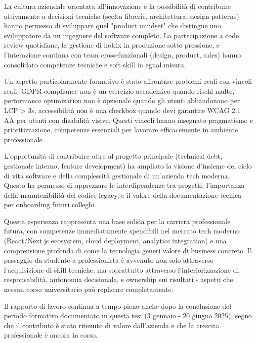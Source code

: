 La cultura aziendale orientata all'innovazione e la possibilità di 
contribuire attivamente a decisioni tecniche (scelta librerie, 
architettura, design patterns) hanno permesso di sviluppare quel 
"product mindset" che distingue uno sviluppatore da un ingegnere del 
software completo. La partecipazione a code review quotidiane, la 
gestione di hotfix in produzione sotto pressione, e l'interazione 
continua con team cross-funzionali (design, product, sales) hanno 
consolidato competenze tecniche e soft skill in egual misura.

Un aspetto particolarmente formativo è stato affrontare problemi reali 
con vincoli reali: GDPR compliance non è un esercizio accademico quando 
rischi multe, performance optimization non è opzionale quando gli utenti 
abbandonano per LCP > 3s, accessibilità non è una checkbox quando devi 
garantire WCAG 2.1 AA per utenti con disabilità visive. Questi vincoli 
hanno insegnato pragmatismo e prioritizzazione, competenze essenziali 
per lavorare efficacemente in ambiente professionale.

L'opportunità di contribuire oltre al progetto principale (technical 
debt, gestionale interno, feature development) ha ampliato la visione 
d'insieme del ciclo di vita software e della complessità gestionale di 
un'azienda tech moderna. Questo ha permesso di apprezzare le 
interdipendenze tra progetti, l'importanza della manutenibilità del 
codice legacy, e il valore della documentazione tecnica per onboarding 
futuri colleghi.

Questa esperienza rappresenta una base solida per la carriera 
professionale futura, con competenze immediatamente spendibili nel 
mercato tech moderno (React/Next.js ecosystem, cloud deployment, 
analytics integration) e una comprensione profonda di come la tecnologia 
generi valore di business concreto. Il passaggio da studente a 
professionista è avvenuto non solo attraverso l'acquisizione di skill 
tecniche, ma soprattutto attraverso l'interiorizzazione di responsabilità, 
autonomia decisionale, e ownership sui risultati - aspetti che nessun 
corso universitario può replicare completamente.

Il rapporto di lavoro continua a tempo pieno anche dopo la conclusione 
del periodo formativo documentato in questa tesi (3 gennaio - 20 giugno 
2025), segno che il contributo è stato ritenuto di valore dall'azienda 
e che la crescita professionale è ancora in corso.